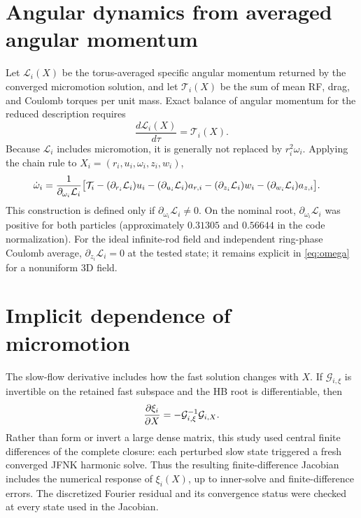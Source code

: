 \documentclass[11pt]{article}
\begin{document}
\section{Angular dynamics from averaged angular momentum}
Let $\mathcal L_i(X)$ be the torus-averaged specific angular momentum returned
by the converged micromotion solution, and let $\mathcal T_i(X)$ be the sum
of mean RF, drag, and Coulomb torques per unit mass. Exact balance of angular
momentum for the reduced description requires
\begin{equation}
 \frac{d\mathcal L_i(X)}{d\tau}=\mathcal T_i(X).
 \label{eq:torque}
\end{equation}
Because $\mathcal L_i$ includes micromotion, it is generally not replaced by
$r_i^2\omega_i$. Applying the chain rule to $X_i=(r_i,u_i,\omega_i,z_i,w_i)$,
\begin{align}
 \dot\omega_i={1\over \partial_{\omega_i}\mathcal L_i}\big[\mathcal T_i
 &-(\partial_{r_i}\mathcal L_i)u_i
 -(\partial_{u_i}\mathcal L_i)a_{r,i}
 -(\partial_{z_i}\mathcal L_i)w_i
 -(\partial_{w_i}\mathcal L_i)a_{z,i}\big].
 \label{eq:omega}
\end{align}
This construction is defined only if $\partial_{\omega_i}\mathcal L_i\ne0$.
On the nominal root, $\partial_{\omega_i}\mathcal L_i$ was positive for both
particles (approximately $0.31305$ and $0.56644$ in the code normalization).
For the ideal infinite-rod field and independent ring-phase Coulomb average,
$\partial_{z_i}\mathcal L_i=0$ at the tested state; it remains explicit in
\eqref{eq:omega} for a nonuniform 3D field.

\section{Implicit dependence of micromotion}
The slow-flow derivative includes how the fast solution changes with $X$.
If $\mathcal G_{i,\xi}$ is invertible on the retained fast subspace and the
HB root is differentiable, then
\begin{equation}
 {\partial\xi_i\over\partial X}
 =-\mathcal G_{i,\xi}^{-1}\mathcal G_{i,X}.
 \label{eq:implicit}
\end{equation}
Rather than form or invert a large dense matrix, this study used central
finite differences of the complete closure: each perturbed slow state triggered
a fresh converged JFNK harmonic solve. Thus the resulting finite-difference
Jacobian includes the numerical response of $\xi_i(X)$, up to inner-solve and
finite-difference errors. The discretized Fourier residual and its convergence
status were checked at every state used in the Jacobian.
\end{document}
